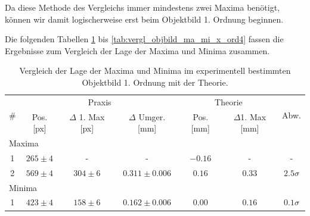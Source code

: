 Da diese Methode des Vergleichs immer mindestens zwei Maxima benötigt, können wir damit logischerweise erst beim Objektbild 1. Ordnung beginnen.

Die folgenden Tabellen \ref{tab:vergl_objbild_ma_mi_x_ord1} bis \ref{tab:vergl_objbild_ma_mi_x_ord4} fassen die Ergebnisse zum Vergleich der Lage der Maxima und Minima zusammen.

\newpage

\begin{table}[H]
  \centering
  \caption{Vergleich der Lage der Maxima und Minima im experimentell bestimmten Objektbild 1. Ordnung mit der Theorie.}
  \vspace*{0.5em}
  \begin{tabular}{|c|c|c|c|c|c|c|}\hline
    \multirow{2}{*}{\#} & \multicolumn{3}{c|}{Praxis} & \multicolumn{2}{c|}{Theorie} & \multirow{2}{*}{Abw.}\\\cline{2-6}
        & Pos. [px] & $\Delta$ 1. Max [px] & $\Delta$ Umger. [mm] & Pos. [mm] & $\Delta$1. Max [mm] & \\\hline
    \multicolumn{7}{|l|}{Maxima}\\\hline
    1   & $265 \pm 4$ & -                 & -             & $-0.16$ & -                 & - \\
    2   & $ 569 \pm 4$ & $304 \pm 6$ & $0.311 \pm 0.006$ & $0.16$ & $0.33$ & $2.5\sigma$\\\hline
    \multicolumn{7}{|l|}{Minima}\\\hline
    1   & $423 \pm 4$ & $158 \pm 6$ & $0.162 \pm 0.006$ & $0.00$ & $0.16$ & $0.1\sigma$\\\hline
  \end{tabular}
  \label{tab:vergl_objbild_ma_mi_x_ord1}
\end{table}
